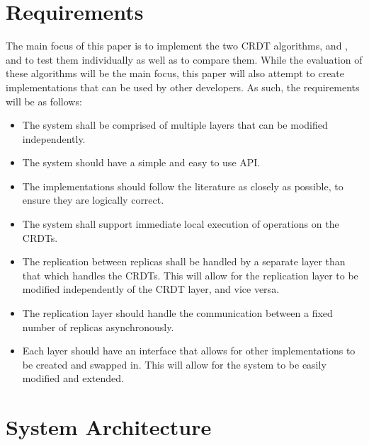 \documentclass[12pt]{report}
\begin{document}
\section{Requirements}
The main focus of this paper is to implement the two CRDT algorithms, \cite{9563274} and \cite{https://doi.org/10.48550/arxiv.2103.04828}, and to test them individually as well as to compare them. While the evaluation of these algorithms will be the main focus, this paper will also attempt to create implementations that can be used by other developers. As such, the requirements will be as follows:
\begin{itemize}
    \item The system shall be comprised of multiple layers that can be modified independently.
    \item The system should have a simple and easy to use API.
    \item The implementations should follow the literature as closely as possible, to ensure they are logically correct.
    \item The system shall support immediate local execution of operations on the CRDTs.
    \item The replication between replicas shall be handled by a separate layer than that which handles the CRDTs. This will allow for the replication layer to be modified independently of the CRDT layer, and vice versa.
    \item The replication layer should handle the communication between a fixed number of replicas asynchronously.
    \item Each layer should have an interface that allows for other implementations to be created and swapped in. This will allow for the system to be easily modified and extended.
\end{itemize}

\section{System Architecture}\label{sec:architecture}
\end{document}

